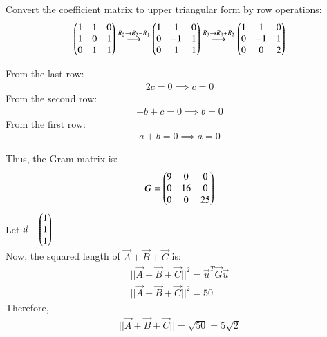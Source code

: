 \documentclass[journal]{IEEEtran}
\begin{document}
Convert the coefficient matrix to upper triangular form by row operations:
\begin{align}
\begin{pmatrix}
1 & 1 & 0 \\
1 & 0 & 1 \\
0 & 1 & 1
\end{pmatrix}
\overset{R_2 \to R_2 - R_1}{\longrightarrow}
\begin{pmatrix}
1 & 1 & 0 \\
0 & -1 & 1 \\
0 & 1 & 1
\end{pmatrix}
\overset{R_3 \to R_3 + R_2}{\longrightarrow}
\begin{pmatrix}
1 & 1 & 0 \\
0 & -1 & 1 \\
0 & 0 & 2
\end{pmatrix}
\end{align}

From the last row:
\begin{align}
2c = 0 \implies c = 0
\end{align}
From the second row:
\begin{align}
- b + c = 0 \implies b = 0
\end{align}
From the first row:
\begin{align}
a + b = 0 \implies a = 0
\end{align}

Thus, the Gram matrix is:
\begin{align}
G = \begin{pmatrix}
9 & 0 & 0 \\
0 & 16 & 0 \\
0 & 0 & 25
\end{pmatrix}
\end{align}
Let $\Vec{u}=\begin{pmatrix}1 \\ 1 \\ 1\end{pmatrix}$\\
Now, the squared length of $\Vec{A} + \Vec{B} + \Vec{C}$ is:
\begin{align}
||\Vec{A} + \Vec{B} + \Vec{C}||^2 = \Vec{u}^T \Vec{G} \Vec{u}\\
||\Vec{A} + \Vec{B} + \Vec{C}||^2 = 50
\end{align}
Therefore,
\begin{align}
||\Vec{A} + \Vec{B} + \Vec{C}|| = \sqrt{50} = 5 \sqrt{2}
\end{align}
\end{document}
